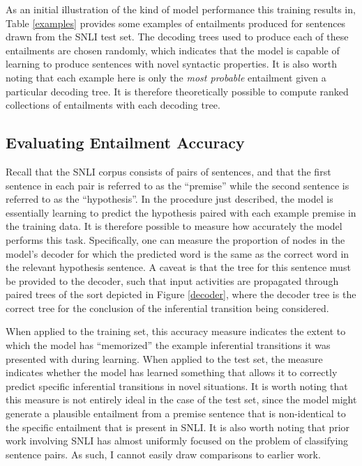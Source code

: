 As an initial illustration of the kind of model performance this training results in, Table \ref{examples} provides some examples of entailments produced for sentences drawn from the SNLI test set. The decoding trees used to produce each of these entailments are chosen randomly, which indicates that the model is capable of learning to produce sentences with novel syntactic properties. It is also worth noting that each example here is only the \textit{most probable} entailment given a particular decoding tree. It is therefore theoretically possible to compute ranked collections of entailments with each decoding tree.  

\subsection{Evaluating Entailment Accuracy}

Recall that the SNLI corpus consists of pairs of sentences, and that the first sentence in each pair is referred to as the ``premise'' while the second sentence is referred to as the ``hypothesis''. In the procedure just described, the model is essentially learning to predict the hypothesis paired with each example premise in the training data. It is therefore possible to measure how accurately the model performs this task. Specifically, one can measure the proportion of nodes in the model's decoder for which the predicted word is the same as the correct word in the relevant hypothesis sentence. A caveat is that the tree for this sentence must be provided to the decoder, such that input activities are propagated through paired trees of the sort depicted in Figure \ref{decoder}, where the decoder tree is the correct tree for the conclusion of the inferential transition being considered.

When applied to the training set, this accuracy measure indicates the extent to which the model has ``memorized'' the example inferential transitions it was presented with during learning. When applied to the test set, the measure indicates whether the model has learned something that allows it to correctly predict specific inferential transitions in novel situations. It is worth noting that this measure is not entirely ideal in the case of the test set, since the model might generate a plausible entailment from a premise sentence that is non-identical to the specific entailment that is present in SNLI. It is also worth noting that prior work involving SNLI has almost uniformly focused on the problem of classifying sentence pairs. As such, I cannot easily draw comparisons to earlier work.

